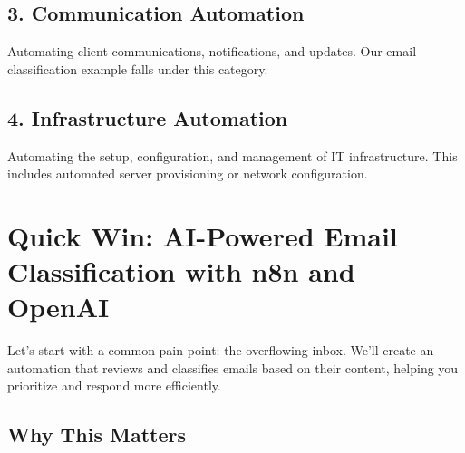\subsection{3. Communication Automation}
Automating client communications, notifications, and updates. Our email classification example falls under this category.

\subsection{4. Infrastructure Automation}
Automating the setup, configuration, and management of IT infrastructure. This includes automated server provisioning or network configuration.


\section{Quick Win: AI-Powered Email Classification with n8n and OpenAI}

Let's start with a common pain point: the overflowing inbox. We'll create an automation that reviews and classifies emails based on their content, helping you prioritize and respond more efficiently.

\subsection{Why This Matters}

